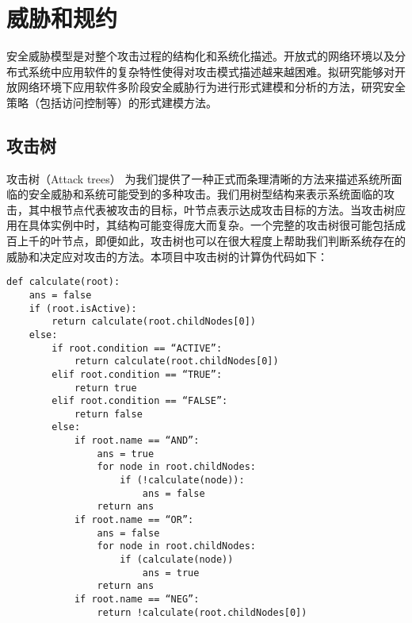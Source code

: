 \section{威胁和规约}
安全威胁模型是对整个攻击过程的结构化和系统化描述。开放式的网络环境以及分布式系统中应用软件的复杂特性使得对攻击模式描述越来越困难。拟研究能够对开放网络环境下应用软件多阶段安全威胁行为进行形式建模和分析的方法，研究安全策略（包括访问控制等）的形式建模方法。
\subsection{攻击树}
攻击树（Attack trees） 为我们提供了一种正式而条理清晰的方法来描述系统所面临的安全威胁和系统可能受到的多种攻击。我们用树型结构来表示系统面临的攻击，其中根节点代表被攻击的目标，叶节点表示达成攻击目标的方法。当攻击树应用在具体实例中时，其结构可能变得庞大而复杂。一个完整的攻击树很可能包括成百上千的叶节点，即便如此，攻击树也可以在很大程度上帮助我们判断系统存在的威胁和决定应对攻击的方法。本项目中攻击树的计算伪代码如下：
\begin{lstlisting}
def calculate(root):
	ans = false
	if (root.isActive):
		return calculate(root.childNodes[0])
	else:
		if root.condition == “ACTIVE”:
			return calculate(root.childNodes[0])
		elif root.condition == “TRUE”:
			return true
		elif root.condition == “FALSE”:
			return false
		else:
			if root.name == “AND”:
				ans = true
				for node in root.childNodes:
					if (!calculate(node)):
						ans = false
				return ans
			if root.name == “OR”:
				ans = false
				for node in root.childNodes:
					if (calculate(node))
						ans = true
				return ans
			if root.name == “NEG”:
				return !calculate(root.childNodes[0])

\end{lstlisting}
